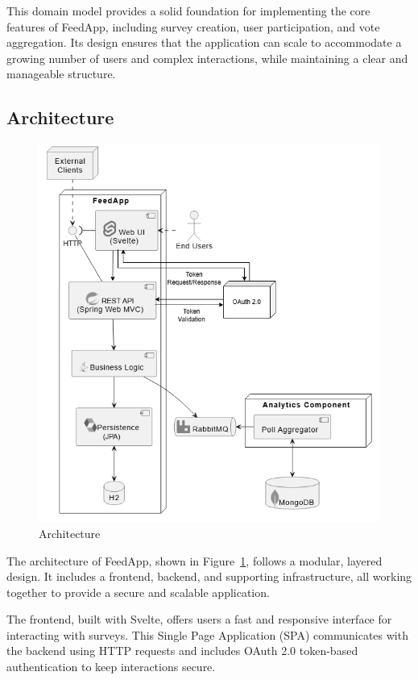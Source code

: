 \noindent
This domain model provides a solid foundation for implementing the core features of FeedApp, including survey creation, user participation, and vote aggregation. Its design ensures that the application can scale to accommodate a growing number of users and complex interactions, while maintaining a clear and manageable structure.

\subsection{Architecture}
\begin{figure}[!htbp]
	\centering
	\includegraphics[scale=0.5]{figs/architecture.png}
	\caption{Architecture}
	\label{fig:architecture}
\end{figure}

The architecture of FeedApp, shown in Figure~\ref{fig:architecture}, follows a modular, layered design. It includes a frontend, backend, and supporting infrastructure, all working together to provide a secure and scalable application.

The frontend, built with Svelte, offers users a fast and responsive interface for interacting with surveys. This Single Page Application (SPA) communicates with the backend using HTTP requests and includes OAuth 2.0 token-based authentication to keep interactions secure.

